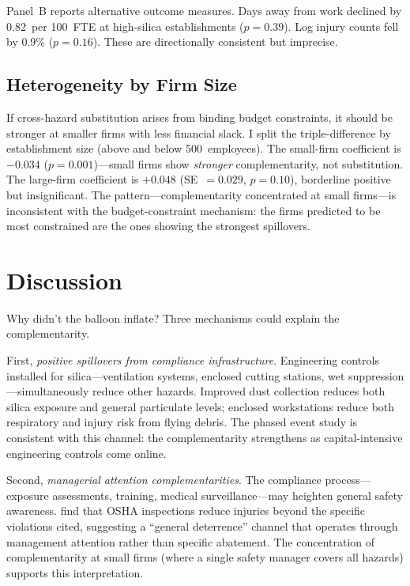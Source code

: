 \documentclass[12pt]{article}
\begin{document}
Panel~B reports alternative outcome measures. Days away from work declined by 0.82~per 100~FTE at high-silica establishments ($p = 0.39$). Log injury counts fell by 0.9\% ($p = 0.16$). These are directionally consistent but imprecise.

\subsection{Heterogeneity by Firm Size}

If cross-hazard substitution arises from binding budget constraints, it should be stronger at smaller firms with less financial slack. I split the triple-difference by establishment size (above and below 500~employees). The small-firm coefficient is $-0.034$ ($p = 0.001$)---small firms show \textit{stronger} complementarity, not substitution. The large-firm coefficient is $+0.048$ (SE~$= 0.029$, $p = 0.10$), borderline positive but insignificant. The pattern---complementarity concentrated at small firms---is inconsistent with the budget-constraint mechanism: the firms predicted to be most constrained are the ones showing the strongest spillovers.


\section{Discussion}
\label{sec:discussion}

Why didn't the balloon inflate? Three mechanisms could explain the complementarity.

First, \textit{positive spillovers from compliance infrastructure}. Engineering controls installed for silica---ventilation systems, enclosed cutting stations, wet suppression---simultaneously reduce other hazards. Improved dust collection reduces both silica exposure and general particulate levels; enclosed workstations reduce both respiratory and injury risk from flying debris. The phased event study is consistent with this channel: the complementarity strengthens as capital-intensive engineering controls come online.

Second, \textit{managerial attention complementarities}. The compliance process---exposure assessments, training, medical surveillance---may heighten general safety awareness. \citet{johnson2023safety} find that OSHA inspections reduce injuries beyond the specific violations cited, suggesting a ``general deterrence'' channel that operates through management attention rather than specific abatement. The concentration of complementarity at small firms (where a single safety manager covers all hazards) supports this interpretation.
\end{document}

